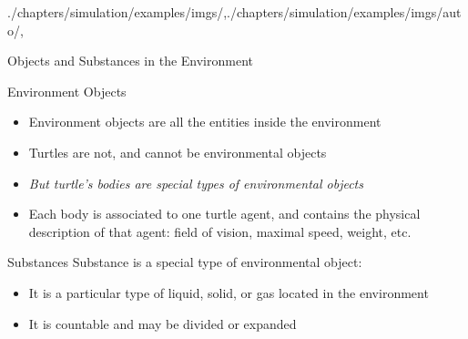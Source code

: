 \begin{graphicspathcontext}{{./chapters/simulation/examples/imgs/},{./chapters/simulation/examples/imgs/auto/},\old}
\begin{frame}{{Objects and Substances} in the Environment}
	\small
	\begin{block}{Environment Objects}
		\begin{itemize}
		\item Environment objects are all the entities inside the environment
		\item \alert{Turtles are not, and cannot be environmental objects}
		\item \emph{But turtle's bodies are special types of environmental objects}
		\item Each body is associated to one turtle agent, and contains the physical description of that agent: field of vision, maximal speed, weight, etc.
		\end{itemize}
	\end{block}
	\begin{block}{Substances}
		Substance is a special type of environmental object:
		\begin{itemize}
		\item It is a particular type of liquid, solid, or gas located in the environment
		\item It is countable and may be divided or expanded
		\end{itemize}
	\end{block}
\end{frame}



\end{graphicspathcontext}
